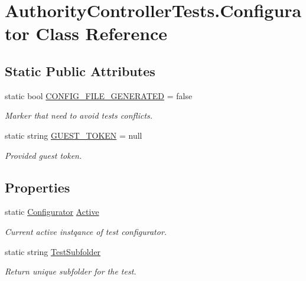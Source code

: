 \hypertarget{class_authority_controller_tests_1_1_configurator}{}\section{Authority\+Controller\+Tests.\+Configurator Class Reference}
\label{class_authority_controller_tests_1_1_configurator}
\subsection*{Static Public Attributes}
\begin{DoxyCompactItemize}
\item 
static bool \mbox{\hyperlink{class_authority_controller_tests_1_1_configurator_adb64f36284f5f547543e07945a086f59}{C\+O\+N\+F\+I\+G\+\_\+\+F\+I\+L\+E\+\_\+\+G\+E\+N\+E\+R\+A\+T\+ED}} = false
\begin{DoxyCompactList}\small\item\em Marker that need to avoid tests conflicts. \end{DoxyCompactList}\item 
static string \mbox{\hyperlink{class_authority_controller_tests_1_1_configurator_a8bb7a4cb1f7bdba792b575a6e6772e39}{G\+U\+E\+S\+T\+\_\+\+T\+O\+K\+EN}} = null
\begin{DoxyCompactList}\small\item\em Provided guest token. \end{DoxyCompactList}\end{DoxyCompactItemize}
\subsection*{Properties}
\begin{DoxyCompactItemize}
\item 
static \mbox{\hyperlink{class_authority_controller_tests_1_1_configurator}{Configurator}} \mbox{\hyperlink{class_authority_controller_tests_1_1_configurator_ab9ca617d4f63c060c5446b24628f2774}{Active}}
\begin{DoxyCompactList}\small\item\em Current active instqance of test configurator. \end{DoxyCompactList}\item 
static string \mbox{\hyperlink{class_authority_controller_tests_1_1_configurator_a5f07aec045009437243f33e3cabc2fdd}{Test\+Subfolder}}
\begin{DoxyCompactList}\small\item\em Return unique subfolder for the test. \end{DoxyCompactList}\end{DoxyCompactItemize}
